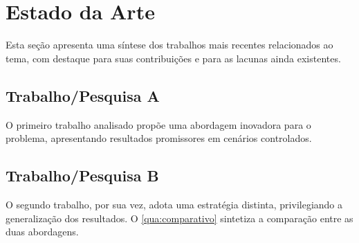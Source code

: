 \chapter{Estado da Arte}
\label{cap:estado-da-arte}


Esta seção apresenta uma síntese dos trabalhos mais recentes relacionados ao tema, com destaque para suas contribuições e para as lacunas ainda existentes.

\section{Trabalho/Pesquisa A}
\label{sec:trabalho-a}

O primeiro trabalho analisado propõe uma abordagem inovadora para o problema, apresentando resultados promissores em cenários controlados.

\section{Trabalho/Pesquisa B}
\label{sec:trabalho-b}

O segundo trabalho, por sua vez, adota uma estratégia distinta, privilegiando a generalização dos resultados. O \autoref{qua:comparativo} sintetiza a comparação entre as duas abordagens.

\begin{quadro}[!htbp]
    \centering
\end{quadro}

%
